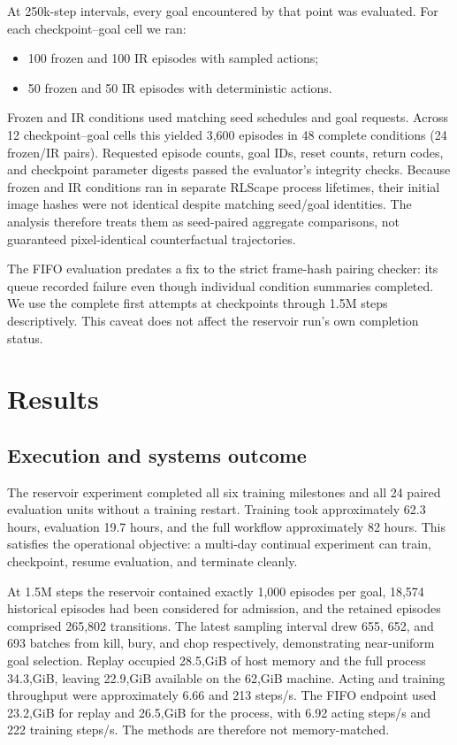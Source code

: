 \documentclass[10pt]{article}
\begin{document}
At 250k-step intervals, every goal encountered by that point was evaluated. For each checkpoint--goal cell we ran:
\begin{itemize}
  \item 100 frozen and 100 IR episodes with sampled actions;
  \item 50 frozen and 50 IR episodes with deterministic actions.
\end{itemize}
Frozen and IR conditions used matching seed schedules and goal requests. Across 12 checkpoint--goal cells this yielded 3,600 episodes in 48 complete conditions (24 frozen/IR pairs). Requested episode counts, goal IDs, reset counts, return codes, and checkpoint parameter digests passed the evaluator's integrity checks. Because frozen and IR conditions ran in separate RLScape process lifetimes, their initial image hashes were not identical despite matching seed/goal identities. The analysis therefore treats them as seed-paired aggregate comparisons, not guaranteed pixel-identical counterfactual trajectories.

The FIFO evaluation predates a fix to the strict frame-hash pairing checker: its queue recorded failure even though individual condition summaries completed. We use the complete first attempts at checkpoints through 1.5M steps descriptively. This caveat does not affect the reservoir run's own completion status.

\section{Results}

\subsection{Execution and systems outcome}

The reservoir experiment completed all six training milestones and all 24 paired evaluation units without a training restart. Training took approximately 62.3 hours, evaluation 19.7 hours, and the full workflow approximately 82 hours. This satisfies the operational objective: a multi-day continual experiment can train, checkpoint, resume evaluation, and terminate cleanly.

At 1.5M steps the reservoir contained exactly 1,000 episodes per goal, 18,574 historical episodes had been considered for admission, and the retained episodes comprised 265,802 transitions. The latest sampling interval drew 655, 652, and 693 batches from kill, bury, and chop respectively, demonstrating near-uniform goal selection. Replay occupied 28.5,GiB of host memory and the full process 34.3,GiB, leaving 22.9,GiB available on the 62,GiB machine. Acting and training throughput were approximately 6.66 and 213 steps/s. The FIFO endpoint used 23.2,GiB for replay and 26.5,GiB for the process, with 6.92 acting steps/s and 222 training steps/s. The methods are therefore not memory-matched.
\end{document}
